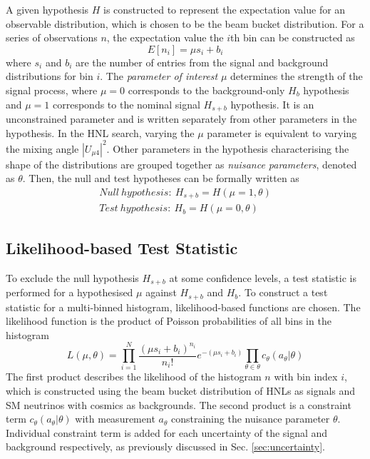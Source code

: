 A given hypothesis $H$ is constructed to represent the expectation value for an observable distribution, which is chosen to be the beam bucket distribution.
For a series of observations $n$, the expectation value the $i$th bin can be constructed as 
\begin{equation}
    E[n_i] = \mu s_i + b_i    
\end{equation}
where $s_i$ and $b_i$ are the number of entries from the signal and background distributions for bin $i$.
The \textit{parameter of interest} $\mu$ determines the strength of the signal process, where $\mu = 0$ corresponds to the background-only $H_{b}$ hypothesis and $\mu = 1$ corresponds to the nominal signal $H_{s+b}$ hypothesis.
It is an unconstrained parameter and is written separately from other parameters in the hypothesis.
In the HNL search, varying the $\mu$ parameter is equivalent to varying the mixing angle $|U_{\mu4}|^{2}$.
Other parameters in the hypothesis characterising the shape of the distributions are grouped together as \textit{nuisance parameters}, denoted as $\theta$.
Then, the null and test hypotheses can be formally written as
\begin{align}
    Null\ hypothesis:\ H_{s+b} = H (\mu = 1, \theta) \\
    Test\ hypothesis:\ H_{b} = H (\mu = 0, \theta)
\end{align}

\subsection{Likelihood-based Test Statistic}

To exclude the null hypothesis $H_{s+b}$ at some confidence levels, a test statistic is performed for a hypothesised $\mu$ against $H_{s+b}$ and $H_{b}$.
To construct a test statistic for a multi-binned histogram, likelihood-based functions are chosen.
The likelihood function is the product of Poisson probabilities of all bins in the histogram \cite{asymptotic_test}
\begin{equation}
\label{eq:LLH_func}
    L(\mu, \theta) =  \prod_{i=1}^{N} \frac{(\mu s_i + b_i)^{n_i}}{n_i!} e^{-(\mu s_i + b_i)}  \prod_{\theta\in\theta} c_\theta(a_\theta|\theta)
\end{equation}
The first product describes the likelihood of the histogram $n$ with bin index $i$, which is constructed using the beam bucket distribution of HNLs as signals and SM neutrinos with cosmics as backgrounds. 
The second product is a constraint term $c_\theta(a_\theta|\theta)$ with measurement $a_\theta$ constraining the nuisance parameter $\theta$.
Individual constraint term is added for each uncertainty of the signal and background respectively, as previously discussed in Sec. \ref{sec:uncertainty}. 

